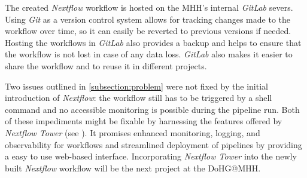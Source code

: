 The created \textit{Nextflow} workflow is hosted on the \ac{MHH}'s internal \textit{GitLab} severs. Using \textit{Git} as a version control system allows for tracking changes made to the workflow over time, so it can easily be reverted to previous versions if needed. Hosting the workflows in \textit{GitLab} also provides a backup and helps to ensure that the workflow is not lost in case of any data loss. \textit{GitLab} also makes it easier to share the workflow and to reuse it in different projects.

Two issues outlined in \cref{subsection:problem} were not fixed by the initial introduction of \textit{Nextflow}: the workflow still has to be triggered by a shell command and no accessible monitoring is possible during the pipeline run. Both of these impediments might be fixable by harnessing the features offered by \textit{Nextflow Tower} (see \autocite{SeqeraLabs2022g}). It promises enhanced monitoring, logging, and observability for workflows and streamlined deployment of pipelines by providing a easy to use web-based interface. Incorporating \textit{Nextflow Tower} into the newly built \textit{Nextflow} workflow will be the next project at the \ac{DoHG@MHH}.
